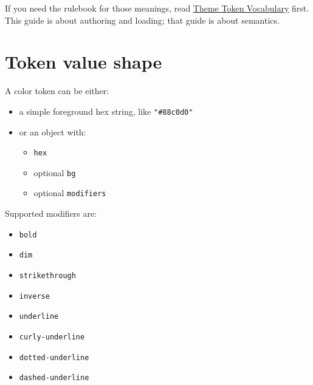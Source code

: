 If you need the rulebook for those meanings, read \href{https://github.com/flyingrobots/bijou/blob/cbd70612140e7a450d764b3c7be1c6af878b99bc/docs/design-system/theme-tokens.md}{Theme Token Vocabulary} first. This guide is about authoring and loading; that guide is about semantics.

\section{Token value shape}\label{record-026-token-value-shape}

A color token can be either:

\begin{itemize}
\tightlist
\item
  a simple foreground hex string, like \texttt{"\allowbreak{}\#\allowbreak{}8\allowbreak{}8\allowbreak{}c\allowbreak{}0\allowbreak{}d\allowbreak{}0\allowbreak{}"}
\item
  or an object with:

  \begin{itemize}
  \tightlist
  \item
    \texttt{h\allowbreak{}e\allowbreak{}x}
  \item
    optional \texttt{b\allowbreak{}g}
  \item
    optional \texttt{m\allowbreak{}o\allowbreak{}d\allowbreak{}i\allowbreak{}f\allowbreak{}i\allowbreak{}e\allowbreak{}r\allowbreak{}s}
  \end{itemize}
\end{itemize}

Supported modifiers are:

\begin{itemize}
\tightlist
\item
  \texttt{b\allowbreak{}o\allowbreak{}l\allowbreak{}d}
\item
  \texttt{d\allowbreak{}i\allowbreak{}m}
\item
  \texttt{s\allowbreak{}t\allowbreak{}r\allowbreak{}i\allowbreak{}k\allowbreak{}e\allowbreak{}t\allowbreak{}h\allowbreak{}r\allowbreak{}o\allowbreak{}u\allowbreak{}g\allowbreak{}h}
\item
  \texttt{i\allowbreak{}n\allowbreak{}v\allowbreak{}e\allowbreak{}r\allowbreak{}s\allowbreak{}e}
\item
  \texttt{u\allowbreak{}n\allowbreak{}d\allowbreak{}e\allowbreak{}r\allowbreak{}l\allowbreak{}i\allowbreak{}n\allowbreak{}e}
\item
  \texttt{c\allowbreak{}u\allowbreak{}r\allowbreak{}l\allowbreak{}y\allowbreak{}-\allowbreak{}u\allowbreak{}n\allowbreak{}d\allowbreak{}e\allowbreak{}r\allowbreak{}l\allowbreak{}i\allowbreak{}n\allowbreak{}e}
\item
  \texttt{d\allowbreak{}o\allowbreak{}t\allowbreak{}t\allowbreak{}e\allowbreak{}d\allowbreak{}-\allowbreak{}u\allowbreak{}n\allowbreak{}d\allowbreak{}e\allowbreak{}r\allowbreak{}l\allowbreak{}i\allowbreak{}n\allowbreak{}e}
\item
  \texttt{d\allowbreak{}a\allowbreak{}s\allowbreak{}h\allowbreak{}e\allowbreak{}d\allowbreak{}-\allowbreak{}u\allowbreak{}n\allowbreak{}d\allowbreak{}e\allowbreak{}r\allowbreak{}l\allowbreak{}i\allowbreak{}n\allowbreak{}e}
\end{itemize}

